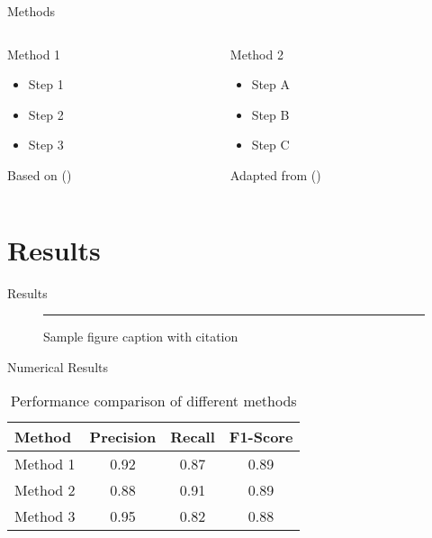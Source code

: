 \documentclass[aspectratio=169]{beamer}
\newcommand{\simplecite}[1]{{\footnotesize #1}}
\begin{document}
\begin{frame}{Methods}
  \begin{columns}[T]
    \begin{column}{0.48\textwidth}
      \begin{block}{Method 1}
        \begin{itemize}
          \item Step 1
          \item Step 2
          \item Step 3
        \end{itemize}
        \simplecite{Based on \citeauthor{Johnson2019} (\citeyear{Johnson2019})}
      \end{block}
    \end{column}
    \begin{column}{0.48\textwidth}
      \begin{block}{Method 2}
        \begin{itemize}
          \item Step A
          \item Step B
          \item Step C
        \end{itemize}
        \simplecite{Adapted from \citeauthor{Garcia2021} (\citeyear{Garcia2021})}
      \end{block}
    \end{column}
  \end{columns}
\end{frame}

\section{Results}

\begin{frame}{Results}
  \begin{figure}
    \centering
    \rule{0.8\textwidth}{0.6\textheight} %
    \caption{Sample figure caption with citation \cite{Wang2018}}
  \end{figure}
\end{frame}

\begin{frame}{Numerical Results}
  \begin{table}
    \centering
    \begin{tabular}{lccc}
      \hline
      \textbf{Method} & \textbf{Precision} & \textbf{Recall} & \textbf{F1-Score} \\
      \hline
      Method 1 & 0.92 & 0.87 & 0.89 \\
      Method 2 & 0.88 & 0.91 & 0.89 \\
      Method 3 & 0.95 & 0.82 & 0.88 \\
      \hline
    \end{tabular}
    \caption{Performance comparison of different methods \cite{Chen2022}}
  \end{table}
\end{frame}
\end{document}
